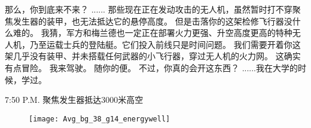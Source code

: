 \documentclass[openany]{book}
\begin{document}
\begin{dialogue}
     那么，你到底来不来？
     ......
     那些现在正在发动攻击的无人机，虽然暂时打不穿聚焦发生器的装甲，也无法抵达它的悬停高度。
     但是击落你的这架检修飞行器没什么难的。
     我猜，军方和梅兰德也一定正在部署火力更强、升空高度更高的特种无人机，乃至运载士兵的登陆艇。它们投入前线只是时间问题。
     我们需要开着你这架几乎没有装甲、并未搭载任何武器的小飞行器，穿过无人机的火力网。
     这确实有点冒险。
     我来驾驶。
     随你的便。
     不过，你真的会开这东西？
     ......我在大学的时候，学过。
\end{dialogue}

7:50 P.M. 聚焦发生器抵达3000米高空
\begin{figure}[h]
    \centering
    \texttt{[image: Avg\_bg\_38\_g14\_energywell]}
\end{figure}
\end{document}
